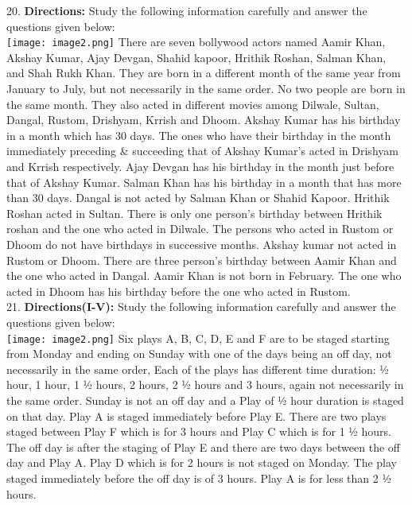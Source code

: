 \documentclass[
]{article}
\begin{document}
20. \textbf{Directions:} Study the following information carefully and answer the questions given
below:\\
\texttt{[image: image2.png]}
There are seven bollywood actors named Aamir Khan, Akshay Kumar, Ajay Devgan,
Shahid kapoor, Hrithik Roshan, Salman Khan, and Shah Rukh Khan. They are born in a
different month of the same year from January to July, but not necessarily in the same order.
No two people are born in the same month. They also acted in different movies among
Dilwale, Sultan, Dangal, Rustom, Drishyam, Krrish and Dhoom.
Akshay Kumar has his birthday in a month which has 30 days. The ones who have their
birthday in the month immediately preceding \& succeeding that of Akshay Kumar’s acted
in Drishyam and Krrish respectively. Ajay Devgan has his birthday in the month just before
that of Akshay Kumar. Salman Khan has his birthday in a month that has more than 30
days. Dangal is not acted by Salman Khan or Shahid Kapoor. Hrithik Roshan acted in
Sultan. There is only one person’s birthday between Hrithik roshan and the one who acted
in Dilwale. The persons who acted in Rustom or Dhoom do not have birthdays in successive
months. Akshay kumar not acted in Rustom or Dhoom. There are three person’s birthday
between Aamir Khan and the one who acted in Dangal. Aamir Khan is not born in
February. The one who acted in Dhoom has his birthday before the one who acted in
Rustom.\\

21. \textbf{Directions(I-V):} Study the following information carefully and answer the questions given
below:\\
\texttt{[image: image2.png]}
Six plays A, B, C, D, E and F are to be staged starting from Monday and ending on Sunday
with one of the days being an off day, not necessarily in the same order, Each of the plays
has different time duration: 1⁄2 hour, 1 hour, 1 1⁄2 hours, 2 hours, 2 1⁄2 hours and 3 hours,
again not necessarily in the same order.
Sunday is not an off day and a Play of 1⁄2 hour duration is staged on that day. Play A is
staged immediately before Play E. There are two plays staged between Play F which is for 3
hours and Play C which is for 1 1⁄2 hours. The off day is after the staging of Play E and there
are two days between the off day and Play A. Play D which is for 2 hours is not staged on
Monday. The play staged immediately before the off day is of 3 hours. Play A is for less than
2 1⁄2 hours.\\
\end{document}

